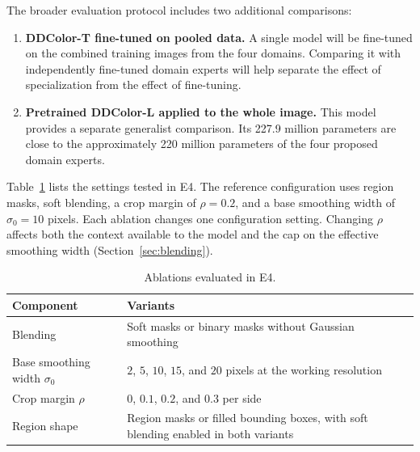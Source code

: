 \documentclass{FastFyp}
\begin{document}
The broader evaluation protocol includes two additional comparisons:

\begin{enumerate}
    \item \textbf{DDColor-T fine-tuned on pooled data.} A single model
          will be fine-tuned on the combined training images from the
          four domains. Comparing it with independently fine-tuned
          domain experts will help separate the effect of specialization
          from the effect of fine-tuning.

    \item \textbf{Pretrained DDColor-L applied to the whole image.}
          This model provides a separate generalist comparison. Its
          227.9 million parameters are close to the approximately
          220 million parameters of the four proposed domain experts.
\end{enumerate}

Table~\ref{tab:ablations} lists the settings tested in E4. The reference
configuration uses region masks, soft blending, a crop margin of
$\rho=0.2$, and a base smoothing width of $\sigma_0=10$ pixels.
Each ablation changes one configuration setting. Changing $\rho$
affects both the context available to the model and the cap on the
effective smoothing width (Section~\ref{sec:blending}).

\begin{table}[htbp]
    \centering
    \caption{Ablations evaluated in E4.}
    \label{tab:ablations}
    \begin{tabular}{p{4.0cm}p{8.5cm}}
        \hline
        \textbf{Component} & \textbf{Variants} \\
        \hline
        Blending &
        Soft masks or binary masks without Gaussian smoothing \\

        Base smoothing width $\sigma_0$ &
        $2$, $5$, $10$, $15$, and $20$ pixels at the working resolution \\

        Crop margin $\rho$ &
        $0$, $0.1$, $0.2$, and $0.3$ per side \\

        Region shape &
        Region masks or filled bounding boxes, with soft blending
        enabled in both variants \\
        \hline
    \end{tabular}
\end{table}
\end{document}
